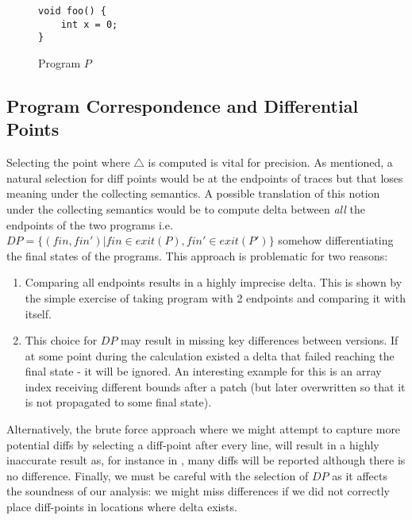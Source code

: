 \begin{figure}[ht] 
\begin{lstlisting}
void foo() {
    int x = 0;
}
\end{lstlisting}
\caption{Program $P$}
\centering
\end{figure}

\subsection{Program Correspondence and Differential Points} 
Selecting the point where $\triangle$ is computed is vital for precision. As mentioned, a natural selection for diff points would be at the endpoints of traces but that loses meaning under the collecting semantics. A possible translation of this notion under the collecting semantics would be to compute delta between \emph{all} the endpoints of the two programs i.e. $DP = \{(fin,fin') | fin \in exit(P), fin' \in exit(P') \}$ somehow differentiating the final states of the programs. This approach is problematic for two reasons:
\begin{enumerate}
\item Comparing all endpoints results in a highly imprecise delta. This is shown by the simple exercise of taking program with 2 endpoints and comparing it with itself.
\item This choice for $DP$ may result in missing key differences between versions. If at some point during the calculation existed a delta that failed reaching the final state - it will be ignored. An interesting example for this is an array index receiving different bounds after a patch (but later overwritten so that it is not propagated to some final state).
\end{enumerate}
Alternatively, the brute force approach where we might attempt to capture more potential diffs by selecting a diff-point after every line, will result in a highly inaccurate result as, for instance in , many diffs will be reported although there is no difference.
Finally, we must be careful with the selection of $DP$ as it affects the soundness of our analysis: we might miss differences if we did not correctly place diff-points in locations where delta exists.
